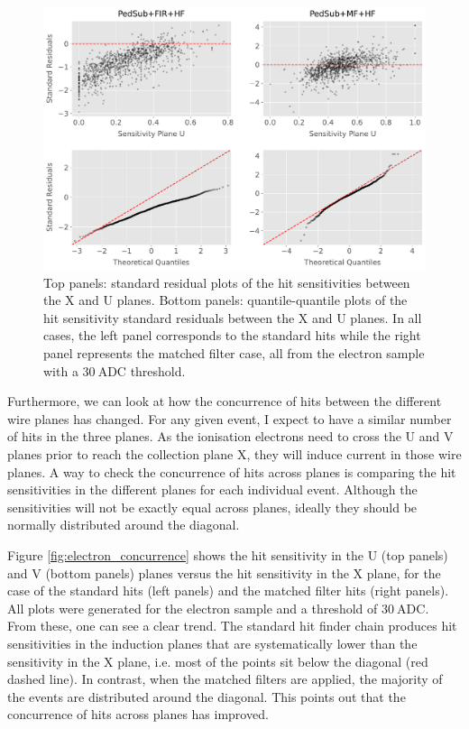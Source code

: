 \begin{figure}[t]
	\centering
	\includegraphics[width=.99\linewidth]{Images/Matched_Filter/hit_study_electron_residuals}
	\caption[Standard residuals and quantile-quantile plots for the hit sensitivity of the X and U planes.]{Top panels: standard residual plots of the hit sensitivities between the X and U planes. Bottom panels: quantile-quantile plots of the hit sensitivity standard residuals between the X and U planes. In all cases, the left panel corresponds to the standard hits while the right panel represents the matched filter case, all from the electron sample with a $30 \ \mathrm{ADC}$ threshold.}
	\label{fig:electron_residuals}
\end{figure}

Furthermore, we can look at how the concurrence of hits between the different wire planes has changed. For any given event, I expect to have a similar number of hits in the three planes. As the ionisation electrons need to cross the U and V planes prior to reach the collection plane X, they will induce current in those wire planes. A way to check the concurrence of hits across planes is comparing the hit sensitivities in the different planes for each individual event. Although the sensitivities will not be exactly equal across planes, ideally they should be normally distributed around the diagonal.

Figure \ref{fig:electron_concurrence} shows the hit sensitivity in the U (top panels) and V (bottom panels) planes versus the hit sensitivity in the X plane, for the case of the standard hits (left panels) and the matched filter hits (right panels). All plots were generated for the electron sample and a threshold of $30 \ \mathrm{ADC}$. From these, one can see a clear trend. The standard hit finder chain produces hit sensitivities in the induction planes that are systematically lower than the sensitivity in the X plane, i.e. most of the points sit below the diagonal (red dashed line). In contrast, when the matched filters are applied, the majority of the events are distributed around the diagonal. This points out that the concurrence of hits across planes has improved.

